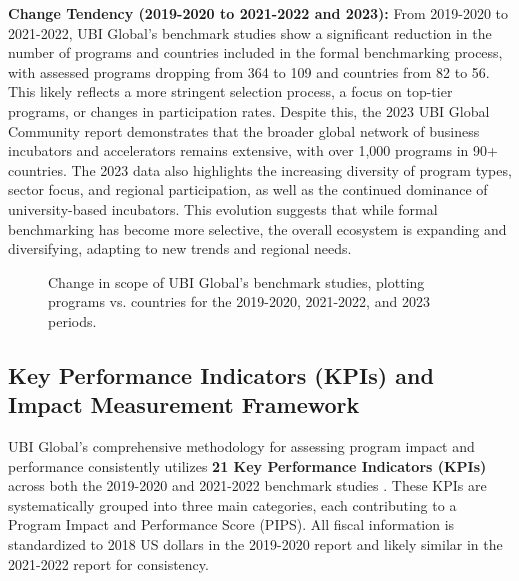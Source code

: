 \documentclass[../Main.tex]{subfiles}%
\begin{document}
	\textbf{Change Tendency (2019-2020 to 2021-2022 and 2023):}
	From 2019-2020 to 2021-2022, UBI Global's benchmark studies show a significant reduction in the number of programs and countries included in the formal benchmarking process, with assessed programs dropping from 364 to 109 and countries from 82 to 56. This likely reflects a more stringent selection process, a focus on top-tier programs, or changes in participation rates. Despite this, the 2023 UBI Global Community report demonstrates that the broader global network of business incubators and accelerators remains extensive, with over 1,000 programs in 90+ countries. The 2023 data also highlights the increasing diversity of program types, sector focus, and regional participation, as well as the continued dominance of university-based incubators. This evolution suggests that while formal benchmarking has become more selective, the overall ecosystem is expanding and diversifying, adapting to new trends and regional needs.
	
	\begin{figure}[h]
		\centering
		\caption{Change in scope of UBI Global's benchmark studies, plotting programs vs. countries for the 2019-2020, 2021-2022, and 2023 periods.}
		\label{fig:ubi_change_tendency}
	\end{figure}
	
	\subsection{Key Performance Indicators (KPIs) and Impact Measurement Framework}
	UBI Global's comprehensive methodology for assessing program impact and performance consistently utilizes \textbf{21 Key Performance Indicators (KPIs)} across both the 2019-2020 and 2021-2022 benchmark studies \autocite{ubi2019world, ubi2021world}. These KPIs are systematically grouped into three main categories, each contributing to a Program Impact and Performance Score (PIPS). All fiscal information is standardized to 2018 US dollars in the 2019-2020 report and likely similar in the 2021-2022 report for consistency.
\end{document}
